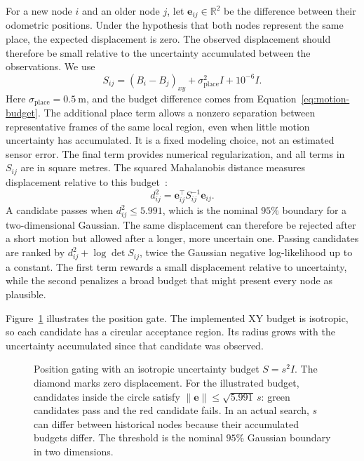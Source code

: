 \documentclass[5p,twocolumn,nonatbib,reversenotenum]{elsarticle}
\begin{document}
For a new node $i$ and an older node $j$, let $\mathbf{e}_{ij}\in\mathbb{R}^2$ be the difference between their odometric positions. Under the hypothesis that both nodes represent the same place, the expected displacement is zero. The observed displacement should therefore be small relative to the uncertainty accumulated between the observations. We use
\begin{equation}
    S_{ij}=(B_i-B_j)_{xy}+\sigma_{\mathrm{place}}^2I+10^{-6}I.
\end{equation}
Here $\sigma_{\mathrm{place}}=\qty{0.5}{\metre}$, and the budget difference comes from Equation~\ref{eq:motion-budget}. The additional place term allows a nonzero separation between representative frames of the same local region, even when little motion uncertainty has accumulated. It is a fixed modeling choice, not an estimated sensor error. The final term provides numerical regularization, and all terms in $S_{ij}$ are in square metres. The squared Mahalanobis distance measures displacement relative to this budget~\cite{Mahalanobis1936}:
\begin{equation}
    d^2_{ij}=\mathbf{e}_{ij}^{\top}S_{ij}^{-1}\mathbf{e}_{ij}.
\end{equation}
A candidate passes when $d^2_{ij}\leq5.991$, which is the nominal $95\%$ boundary for a two-dimensional Gaussian. The same displacement can therefore be rejected after a short motion but allowed after a longer, more uncertain one. Passing candidates are ranked by $d^2_{ij}+\log\det S_{ij}$, twice the Gaussian negative log-likelihood up to a constant. The first term rewards a small displacement relative to uncertainty, while the second penalizes a broad budget that might present every node as plausible.

Figure~\ref{fig:mahalanobis_search} illustrates the position gate. The implemented XY budget is isotropic, so each candidate has a circular acceptance region. Its radius grows with the uncertainty accumulated since that candidate was observed.

\begin{figure}[!htbp]
    \centering
    
    \caption{Position gating with an isotropic uncertainty budget $S=s^2I$. The diamond marks zero displacement. For the illustrated budget, candidates inside the circle satisfy $\lVert\mathbf{e}\rVert\leq\sqrt{5.991}\,s$: green candidates pass and the red candidate fails. In an actual search, $s$ can differ between historical nodes because their accumulated budgets differ. The threshold is the nominal $95\%$ Gaussian boundary in two dimensions.}
    \label{fig:mahalanobis_search}
\end{figure}
\end{document}
